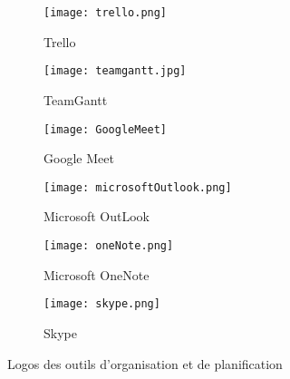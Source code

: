         \begin{figure}[H]
            \begin{subfigure}{0.3\textwidth}
                \centering
                \texttt{[image: trello.png]}
                \caption{Trello}
            \end{subfigure}
            \hfill
            \begin{subfigure}{0.3\textwidth}
                \centering
                \texttt{[image: teamgantt.jpg]}
                \caption{TeamGantt}
            \end{subfigure}
            \hfill
            \begin{subfigure}{0.3\textwidth}
                \centering
                \texttt{[image: GoogleMeet]}
                \caption{Google Meet}
            \end{subfigure}

            \begin{subfigure}{0.3\textwidth}
                \centering
                \texttt{[image: microsoftOutlook.png]}
                \caption{Microsoft OutLook}
            \end{subfigure}
            \hfill
            \begin{subfigure}{0.3\textwidth}
                \centering
                \texttt{[image: oneNote.png]}
                \caption{Microsoft OneNote}
            \end{subfigure}
            \hfill
            \begin{subfigure}{0.3\textwidth}
                \centering
                \texttt{[image: skype.png]}
                \caption{Skype}
            \end{subfigure}
            

            \caption{Logos des outils d'organisation et de planification}
        \end{figure}


        





